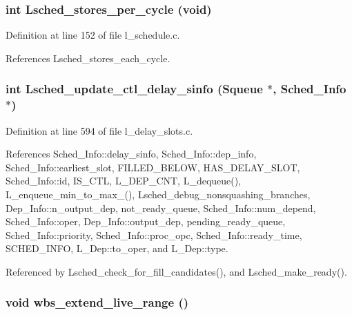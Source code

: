 \subsubsection{\setlength{\rightskip}{0pt plus 5cm}int Lsched\_\-stores\_\-per\_\-cycle (void)}\label{l__schedule_8h_15a5f6106c4f92cb7268d905fdb1ebc8}




Definition at line 152 of file l\_\-schedule.c.

References Lsched\_\-stores\_\-each\_\-cycle.
\subsubsection{\setlength{\rightskip}{0pt plus 5cm}int Lsched\_\-update\_\-ctl\_\-delay\_\-sinfo (\bf{Squeue} $\ast$, \bf{Sched\_\-Info} $\ast$)}\label{l__schedule_8h_5ba30a128fd9e1edf5e538797007509b}




Definition at line 594 of file l\_\-delay\_\-slots.c.

References Sched\_\-Info::delay\_\-sinfo, Sched\_\-Info::dep\_\-info, Sched\_\-Info::earliest\_\-slot, FILLED\_\-BELOW, HAS\_\-DELAY\_\-SLOT, Sched\_\-Info::id, IS\_\-CTL, L\_\-DEP\_\-CNT, L\_\-dequeue(), L\_\-enqueue\_\-min\_\-to\_\-max\_(), Lsched\_\-debug\_\-nonsquashing\_\-branches, Dep\_\-Info::n\_\-output\_\-dep, not\_\-ready\_\-queue, Sched\_\-Info::num\_\-depend, Sched\_\-Info::oper, Dep\_\-Info::output\_\-dep, pending\_\-ready\_\-queue, Sched\_\-Info::priority, Sched\_\-Info::proc\_\-opc, Sched\_\-Info::ready\_\-time, SCHED\_\-INFO, L\_\-Dep::to\_\-oper, and L\_\-Dep::type.

Referenced by Lsched\_\-check\_\-for\_\-fill\_\-candidates(), and Lsched\_\-make\_\-ready().
\subsubsection{\setlength{\rightskip}{0pt plus 5cm}void wbs\_\-extend\_\-live\_\-range ()}\label{l__schedule_8h_654c3ce3e012eb5f44eb74ac29317cec}


